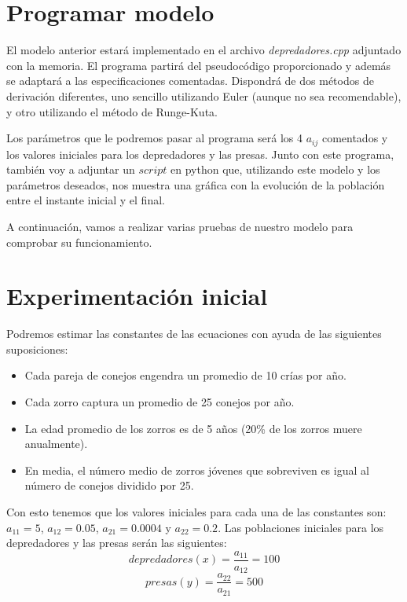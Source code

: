\documentclass[11pt,a4paper]{article}
\begin{document}
\section{Programar modelo}
El modelo anterior estará implementado en el archivo \textit{depredadores.cpp} adjuntado con la memoria. El programa partirá del pseudocódigo
proporcionado y además se adaptará a las especificaciones comentadas. Dispondrá de dos métodos de derivación diferentes, uno sencillo utilizando
Euler (aunque no sea recomendable), y otro utilizando el método de Runge-Kuta.

Los parámetros que le podremos pasar al programa será los 4 $a_{ij}$ comentados y los valores iniciales para los depredadores y las presas.
Junto con este programa, también voy a adjuntar un $script$ en python que, utilizando este modelo y los parámetros deseados, nos muestra una
gráfica con la evolución de la población entre el instante inicial y el final.

A continuación, vamos a realizar varias pruebas de nuestro modelo para comprobar su funcionamiento.


\newpage
\section{Experimentación inicial}

Podremos estimar las constantes de las ecuaciones con ayuda de las siguientes suposiciones:
\begin{itemize}
	\item Cada pareja de conejos engendra un promedio de 10 crías por año.
	\item Cada zorro captura un promedio de 25 conejos por año.
	\item La edad promedio de los zorros es de 5 años (20\% de los zorros muere anualmente).
	\item En media, el número medio de zorros jóvenes que sobreviven es igual al número de conejos dividido por 25.
\end{itemize}

Con esto tenemos que los valores iniciales para cada una de las constantes son: $a_{11}=5$, $a_{12}=0.05$, $a_{21}=0.0004$ y $a_{22}=0.2$.
Las poblaciones iniciales para los depredadores y las presas serán las siguientes:
$$depredadores(x) = \frac{a_{11}}{a_{12}} = 100$$
$$presas(y) = \frac{a_{22}}{a_{21}} = 500$$
\end{document}
